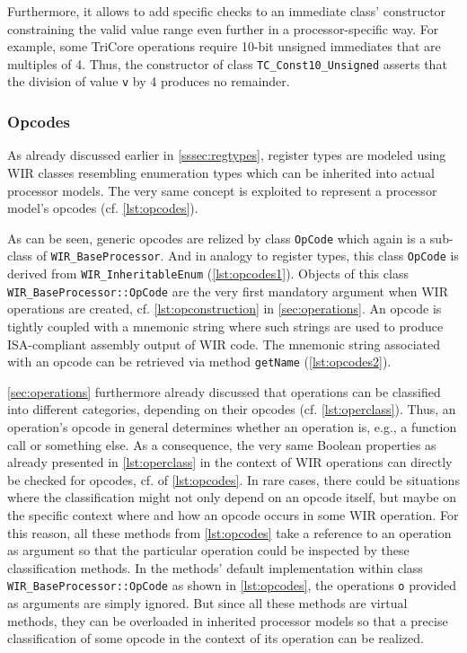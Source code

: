 Furthermore, it allows to add specific checks to an immediate class' constructor constraining the valid value range even further in a processor-specific way.
For example, some TriCore operations require 10-bit unsigned immediates that are multiples of 4.
Thus, the constructor of class \texttt{TC\_Const10\_Unsigned} asserts that the division of value \texttt{v} by 4 produces no remainder.


\subsubsection{Opcodes}
\label{sssec:opcodes}

As already discussed earlier in \cref{sssec:regtypes}, register types are modeled using \gls{WIR} classes resembling enumeration types which can be inherited into actual processor models.
The very same concept is exploited to represent a processor model's opcodes (cf. \cref{lst:opcodes}).

As can be seen, generic opcodes are relized by class \texttt{OpCode} which again is a sub-class of \texttt{WIR\_BaseProcessor}.
And in analogy to register types, this class \texttt{OpCode} is derived from \texttt{WIR\_InheritableEnum} (\cref{lst:opcodes1}).
Objects of this class \texttt{WIR\_BaseProcessor::OpCode} are the very first mandatory argument when \gls{WIR} operations are created, cf. \cref{lst:opconstruction} in \cref{sec:operations}.
An opcode is tightly coupled with a mnemonic string where such strings are used to produce \gls{ISA}-compliant assembly output of \gls{WIR} code.
The mnemonic string associated with an opcode can be retrieved via method \texttt{getName} (\cref{lst:opcodes2}).

\enlargethispage{5mm}

\cref{sec:operations} furthermore already discussed that operations can be classified into different categories, depending on their opcodes (cf. \cref{lst:operclass}).
Thus, an operation's opcode in general determines whether an operation is, e.g., a function call or something else.
As a consequence, the very same Boolean properties as already presented in \cref{lst:operclass} in the context of \gls{WIR} operations can directly be checked for opcodes, cf.  of \cref{lst:opcodes}.
In rare cases, there could be situations where the classification might not only depend on an opcode itself, but maybe on the specific context where and how an opcode occurs in some \gls{WIR} operation.
For this reason, all these methods from \cref{lst:opcodes} take a reference to an operation as argument so that the particular operation could be inspected by these classification methods.
In the methods' default implementation within class \texttt{WIR\_BaseProcessor::OpCode} as shown in \cref{lst:opcodes}, the operations \texttt{o} provided as arguments are simply ignored.
But since all these methods are virtual methods, they can be overloaded in inherited processor models so that a precise classification of some opcode in the context of its operation can be realized.

